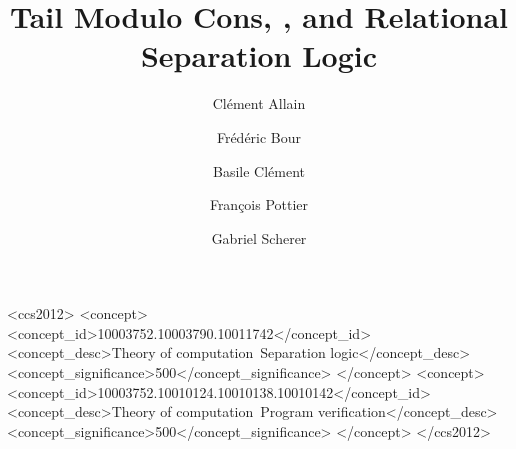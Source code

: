 \documentclass[acmsmall,screen,review]{acmart}
\begin{document}

\title{Tail Modulo Cons, \OCaml, and Relational Separation Logic}

\author{Clément Allain}

\author{Frédéric Bour}

\author{Basile Clément}

\author{François Pottier}

\author{Gabriel Scherer}

\begin{abstract}
    
\end{abstract}

\maketitle


\begin{CCSXML}
<ccs2012>
<concept>
<concept_id>10003752.10003790.10011742</concept_id>
<concept_desc>Theory of computation~Separation logic</concept_desc>
<concept_significance>500</concept_significance>
</concept>
<concept>
<concept_id>10003752.10010124.10010138.10010142</concept_id>
<concept_desc>Theory of computation~Program verification</concept_desc>
<concept_significance>500</concept_significance>
</concept>
</ccs2012>
\end{CCSXML}



\newcommand{\separate}{\FALSE}



\separate{\clearpage}{}

\end{document}
